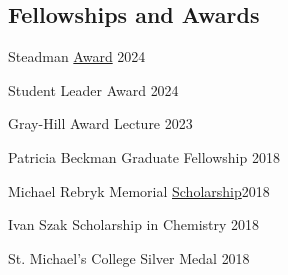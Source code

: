 \documentclass[margin,line]{res}
\newenvironment{list2}{
  \begin{list}{$\bullet$}{%
      \setlength{\itemsep}{0in}
      \setlength{\parsep}{0in} \setlength{\parskip}{0in}
      \setlength{\topsep}{0in} \setlength{\partopsep}{0in} 
      \setlength{\leftmargin}{0.2in}}}{\end{list}}
\begin{document}
\begin{resume}
%






\section{\sc Fellowships  \newline and Awards}
\vspace{2mm}
Steadman \href{https://www.rochester.edu/college/gradstudies/postdocs/steadman-awards.html}{Award} \hfill{2024}

\vspace*{-3mm}

Student Leader Award \hfill {2024}

\vspace*{-3mm}

Gray-Hill Award Lecture \hfill{2023}

\vspace*{-3mm}

Patricia Beckman Graduate Fellowship \hfill {2018}

\vspace*{-3mm}

Michael Rebryk Memorial  \href{http://ucu-building-community.blogspot.ca/2016/03/ucu-adds-new-scholarships-in-2016.html}{Scholarship}\hfill {2018}

\vspace*{-3mm}

Ivan Szak Scholarship in Chemistry \hfill {2018}

\vspace*{-3mm}

St. Michael's College Silver Medal \hfill {2018} 


\end{resume}
\end{document}

